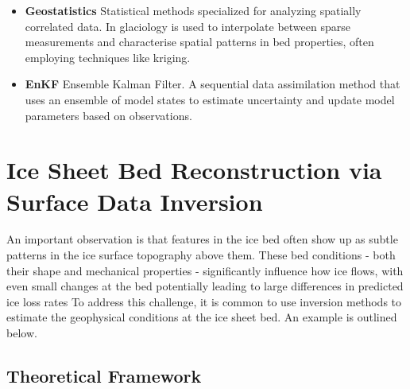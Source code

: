 \begin{itemize}
    \item\textbf{Geostatistics} Statistical methods specialized for analyzing spatially correlated data. In glaciology is used to interpolate between sparse measurements and characterise spatial patterns in bed properties, often employing techniques like kriging\cite{Mackie_2020}.

    \item\textbf{EnKF} Ensemble Kalman Filter. A sequential data assimilation method that uses an ensemble of model states to estimate uncertainty and update model parameters based on observations\cite{Morlighem_Goldberg_2024}.
    
\end{itemize} 

\section*{Ice Sheet Bed Reconstruction via Surface Data Inversion}\label{Ockenden_2022}
An important observation is that features in the ice bed often show up as subtle patterns in the ice surface topography above them\cite{Ockenden_2022}. These bed conditions - both their shape and mechanical properties - significantly influence how ice flows, with even small changes at the bed potentially leading to large differences in predicted ice loss rates%
To address this challenge, it is common to use inversion methods to estimate the geophysical conditions at the ice sheet bed. An example is outlined below.

\subsection*{Theoretical Framework}

